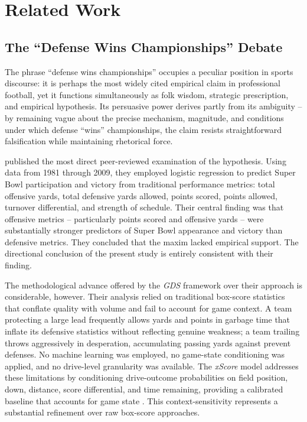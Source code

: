 \documentclass[12pt,a4paper]{article}
\newcommand{\xscore}{\textit{xScore}}
\newcommand{\gds}{\textit{GDS}}
\begin{document}
\section{Related Work}
\label{sec:related-work}

\subsection{The ``Defense Wins Championships'' Debate}
\label{sec:dwc-debate}

The phrase ``defense wins championships'' occupies a peculiar position in sports discourse: it is perhaps the most widely cited empirical claim in professional football, yet it functions simultaneously as folk wisdom, strategic prescription, and empirical hypothesis. Its persuasive power derives partly from its ambiguity -- by remaining vague about the precise mechanism, magnitude, and conditions under which defense ``wins'' championships, the claim resists straightforward falsification while maintaining rhetorical force.

\citet{robst2011defense} published the most direct peer-reviewed examination of the hypothesis. Using data from 1981 through 2009, they employed logistic regression to predict Super Bowl participation and victory from traditional performance metrics: total offensive yards, total defensive yards allowed, points scored, points allowed, turnover differential, and strength of schedule. Their central finding was that offensive metrics -- particularly points scored and offensive yards -- were substantially stronger predictors of Super Bowl appearance and victory than defensive metrics. They concluded that the maxim lacked empirical support. The directional conclusion of the present study is entirely consistent with their finding.

The methodological advance offered by the \gds{} framework over their approach is considerable, however. Their analysis relied on traditional box-score statistics that conflate quality with volume and fail to account for game context. A team protecting a large lead frequently allows yards and points in garbage time that inflate its defensive statistics without reflecting genuine weakness; a team trailing throws aggressively in desperation, accumulating passing yards against prevent defenses. No machine learning was employed, no game-state conditioning was applied, and no drive-level granularity was available. The \xscore{} model addresses these limitations by conditioning drive-outcome probabilities on field position, down, distance, score differential, and time remaining, providing a calibrated baseline that accounts for game state \citep{mecha2026xscore-model}. This context-sensitivity represents a substantial refinement over raw box-score approaches.
\end{document}

